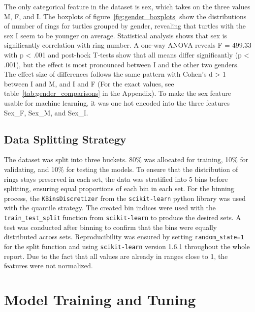 \documentclass[twocolumn]{article}
\begin{document}
The only categorical feature in the dataset is sex, which takes on the three values M, F, and I. The boxplots of figure~\ref{fig:gender_boxplots} show the distributions of number of rings for turtles grouped by gender, revealing that turtles with the sex I seem to be younger on average. Statistical analysis shows that sex is significantly correlation with ring number. A one-way ANOVA reveals F = 499.33 with p \textless{} .001 and post-hock T-tests show that all means differ significantly (p \textless{} .001), but the effect is most pronounced between I and the other two genders. The effect size of differences follows the same pattern with Cohen's d \textgreater{} 1 between I and M, and I and F (For the exact values, see table~\ref{tab:gender_comparisons} in the Appendix). To make the sex feature usable for machine learning, it was one hot encoded into the three features Sex\_F, Sex\_M, and Sex\_I. 

\subsection{Data Splitting Strategy}
The dataset was split into three buckets. 80\% was allocated for training, 10\% for validating, and 10\% for testing the models. 
To ensure that the distribution of rings stays preserved in each set, the data was stratified into 5 bins before splitting, ensuring equal proportions of each bin in each set. For the binning process, the \texttt{KBinsDiscretizer} from the \texttt{scikit-learn} python library was used with the quantile strategy. The created bin indices were used with the \texttt{train\_test\_split} function from \texttt{scikit-learn} to produce the desired sets. A test was conducted after binning to confirm that the bins were equally distributed across sets. Reproducibility was ensured by setting \texttt{random\_state=1} for the split function and using \texttt{scikit-learn} version 1.6.1 throughout the whole report. Due to the fact that all values are already in ranges close to 1, the features were not normalized.


\section{Model Training and Tuning}

\end{document}
